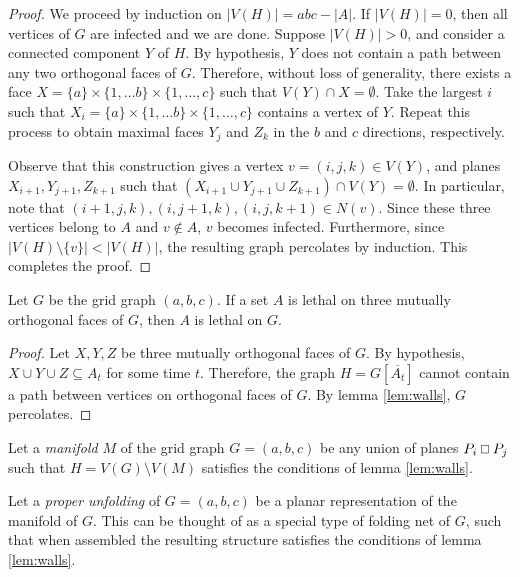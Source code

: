 \begin{proof}
We proceed by induction on $|V(H)| = abc - |A|$. If $|V(H)| = 0$, then all vertices of $G$ are infected and we are done. Suppose $|V(H)| > 0$, and consider a connected component $Y$ of $H$. By hypothesis, $Y$ does not contain a path between any two orthogonal faces of $G$. Therefore, without loss of generality, there exists a face $X = \{a\} \times \{1, \dots b\} \times \{1, \dots, c\}$ such that $V(Y) \cap X = \emptyset$. Take the largest $i$ such that $X_i = \{a\} \times \{1, \dots b\} \times \{1, \dots, c\}$ contains a vertex of $Y$. Repeat this process to obtain maximal faces $Y_j$ and $Z_k$ in the $b$ and $c$ directions, respectively. 

Observe that this construction gives a vertex $v = (i,j,k) \in V(Y)$, and planes $X_{i+1}, Y_{j+1}, Z_{k+1}$ such that $(X_{i+1} \cup Y_{j+1} \cup Z_{k+1}) \cap  V(Y) = \emptyset$. In particular, note that $(i+1,j,k), (i,j+1,k),(i,j,k+1) \in N(v)$. Since these three vertices belong to $A$ and $v \notin A$, $v$ becomes infected. Furthermore, since $|V(H) \setminus \{v\}| < |V(H)|$, the resulting graph percolates by induction. This completes the proof.
\end{proof}

\begin{cor}
\label{cor:three_walls}
Let $G$ be the grid graph $(a,b,c)$. If a set $A$ is lethal on three mutually orthogonal faces of $G$, then $A$ is lethal on $G$.
\end{cor}

\begin{proof}
Let $X, Y, Z$ be three mutually orthogonal faces of $G$. By hypothesis, $X \cup Y \cup Z \subseteq A_t$ for some time $t$. Therefore, the graph $H = G[\overline{A_t}]$ cannot contain a path between vertices on orthogonal faces of $G$. By lemma \ref{lem:walls}, $G$ percolates.
\end{proof}

\begin{defn}
\label{def:manifold}
Let a \emph{manifold} $M$ of the grid graph $G = (a,b,c)$ be any union of planes $P_i \Osq P_j$ such that $H = V(G) \setminus V(M)$ satisfies the conditions of lemma \ref{lem:walls}.
\end{defn}

\begin{defn}
\label{def:proper_unfolding}
Let a \emph{proper unfolding} of $G = (a,b,c)$ be a planar representation of the manifold of $G$. This can be thought of as a special type of folding net of $G$, such that when assembled the resulting structure satisfies the conditions of lemma \ref{lem:walls}.
\end{defn}

